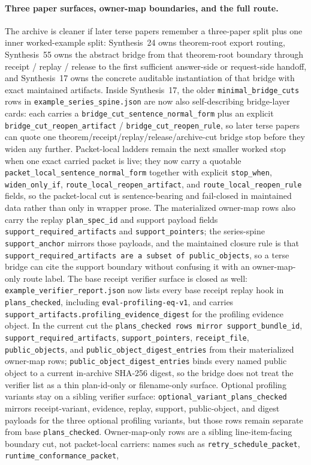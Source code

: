 \documentclass[11pt]{article}
\begin{document}
\paragraph{Three paper surfaces, owner-map boundaries, and the full route.}
The archive is cleaner if later terse papers remember a three-paper split plus one inner worked-example split: Synthesis~24 owns theorem-root export routing, Synthesis~55 owns the abstract bridge from that theorem-root boundary through receipt / replay / release to the first sufficient answer-side or request-side handoff, and Synthesis~17 owns the concrete auditable instantiation of that bridge with exact maintained artifacts. Inside Synthesis~17, the older \texttt{minimal\_bridge\_cuts} rows in \nolinkurl{example\_series\_spine.json} are now also self-describing bridge-layer cards: each carries a \texttt{bridge\_cut\_sentence\_normal\_form} plus an explicit \texttt{bridge\_cut\_reopen\_artifact} / \texttt{bridge\_cut\_reopen\_rule}, so later terse papers can quote one theorem/receipt/replay/release/archive-cut bridge stop before they widen any further. Packet-local ladders remain the next smaller worked stop when one exact carried packet is live; they now carry a quotable \texttt{packet\_local\_sentence\_normal\_form} together with explicit \texttt{stop\_when}, \texttt{widen\_only\_if}, \texttt{route\_local\_reopen\_artifact}, and \texttt{route\_local\_reopen\_rule} fields, so the packet-local cut is sentence-bearing and fail-closed in maintained data rather than only in wrapper prose. The materialized owner-map rows also carry the replay \texttt{plan\_spec\_id} and support payload fields \texttt{support\_required\_artifacts} and \texttt{support\_pointers}; the series-spine \texttt{support\_anchor} mirrors those payloads, and the maintained closure rule is that \texttt{support\_required\_artifacts are a subset of public\_objects}, so a terse bridge can cite the support boundary without confusing it with an owner-map-only route label. The base receipt verifier surface is closed as well: \nolinkurl{example\_verifier\_report.json} now lists every base receipt replay hook in \texttt{plans\_checked}, including \nolinkurl{eval-profiling-eq-v1}, and carries \texttt{support\_artifacts.profiling\_evidence\_digest} for the profiling evidence object. In the current cut the \texttt{plans\_checked rows mirror support\_bundle\_id}, \texttt{support\_required\_artifacts}, \texttt{support\_pointers}, \texttt{receipt\_file}, \texttt{public\_objects}, and \texttt{public\_object\_digest\_entries} from their materialized owner-map rows; \texttt{public\_object\_digest\_entries} binds every named public object to a current in-archive SHA-256 digest, so the bridge does not treat the verifier list as a thin plan-id-only or filename-only surface. Optional profiling variants stay on a sibling verifier surface: \texttt{optional\_variant\_plans\_checked} mirrors receipt-variant, evidence, replay, support, public-object, and digest payloads for the three optional profiling variants, but those rows remain separate from base \texttt{plans\_checked}. Owner-map-only rows are a sibling line-item-facing boundary cut, not packet-local carriers: names such as \texttt{retry\_schedule\_packet}, \texttt{runtime\_conformance\_packet}, 
\end{document}
